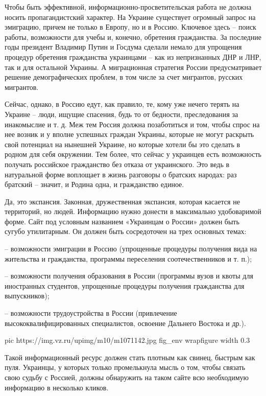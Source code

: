Чтобы быть эффективной, информационно-просветительская работа не должна носить
пропагандистский характер. На Украине существует огромный запрос на эмиграцию,
причем не только в Европу, но и в Россию. Ключевое здесь – поиск работы,
возможности для учебы и, конечно, обретения гражданства. За последние годы
президент Владимир Путин и Госдума сделали немало для упрощения процедур
обретения гражданства украинцами – как из непризнанных ДНР и ЛНР, так и для
остальной Украины. А миграционная стратегия России предусматривает решение
демографических проблем, в том числе за счет мигрантов, русских мигрантов.

Сейчас, однако, в Россию едут, как правило, те, кому уже нечего терять на
Украине – люди, ищущие спасения, будь то от бедности, преследования за
инакомыслие и т. д. Меж тем Россия должна позаботиться и том, чтобы спрос на
нее возник и у вполне успешных граждан Украины, которые не могут раскрыть свой
потенциал на нынешней Украине, но которые хотели бы это сделать в родном для
себя окружении. Тем более, что сейчас у украинцев есть возможность получать
российское гражданство без отказа от украинского. Это ведь в натуральной форме
воплощает в жизнь разговоры о братских народах: раз братский – значит, и Родина
одна, и гражданство единое.

Да, это экспансия. Законная, дружественная экспансия, которая касается не
территорий, но людей. Информацию нужно донести в максимально удобоваримой
форме. Сайт под условным названием «Украинцам о России» должен быть сугубо
утилитарным. Он должен быть сосредоточен на трех основных темах: 

– возможности эмиграции в Россию (упрощенные процедуры получения вида на
жительства и гражданства, программы переселения соотечественников и т. п.);

– возможности получения образования в России (программы вузов и квоты для
иностранных студентов, упрощенные процедуры получения гражданства для
выпускников);

– возможности трудоустройства в России (привлечение высококвалифицированных
специалистов, освоение Дальнего Востока и др.).

\ifcmt
  pic https://img.vz.ru/upimg/m10/m1071142.jpg
	fig_env wrapfigure
	width 0.3
\fi

Такой информационный ресурс должен стать плотным как свинец, быстрым как пуля.
Украинцы, у которых только промелькнула мысль о том, чтобы связать свою судьбу
с Россией, должны обнаружить на таком сайте всю необходимую информацию в
несколько кликов. 

